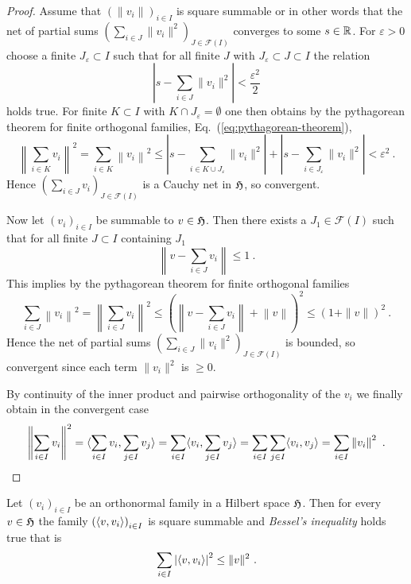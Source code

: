 \begin{proof}
  Assume that $\left(\|v_i\| \right)_{i\in I}$ is square summable or in other words that the net of partial sums
  $\left( \sum_{i\in J} \|v_i\|^2 \right)_{J\in\mathscr{F} (I)}$  converges to some $s \in \mathbb{R}$. 
  For $\varepsilon >0$ choose a finite $J_\varepsilon \subset I$ such that for all finite $J$ with 
  $J_\varepsilon \subset J\subset I$ the relation
  \[
           \left| s - \sum_{i\in J} \|v_i\|^2   \right| < \frac{\varepsilon^2}{2}
  \]
  holds true. For finite $K\subset I$ with $K\cap J_\varepsilon  =\emptyset$ one then obtains by the pythagorean theorem for 
  finite orthogonal families, Eq.~(\ref{eq:pythagorean-theorem}),
  \[
      \left\| \sum_{i\in K} v_i\right\|^2 =  \sum_{i\in K}  \left\| v_i\right\|^2 \leq 
       \left| s - \sum_{i\in K \cup J_\varepsilon} \|v_i\|^2   \right|  + \left| s - \sum_{i\in  J_\varepsilon} \|v_i\|^2   \right|
       < \varepsilon^2 \ .
  \]
  Hence  $\left( \sum_{i\in J} v_i \right)_{J\in\mathscr{F} (I)}$ is a Cauchy net in $\mathfrak{H}$, so convergent. 
 
  Now let  $(v_i)_{i\in I}$ be  summable to $v\in \mathfrak{H}$. 
  Then there exists a $J_1 \in \mathscr{F} (I)$ such that for all finite $J \subset I$ 
  containing  $J_1$
  \[
    \left\| v -  \sum_{i\in J} v_i \right\| \leq 1 \ .
  \] 
  This implies by the pythagorean theorem for finite orthogonal families 
   \[
    \sum_{i\in J} \left\| v_i \right\|^2 =  \left\|  \sum_{i\in J} v_i \right\|^2  \leq 
    \left(  \left\| v -  \sum_{i\in J} v_i \right\| +  \left\| v \right\| \right)^2 \leq  ( 1 + \| v\| )^2 \ .
  \] 
  Hence the net of partial sums $\left( \sum_{i\in J} \|v_i\|^2 \right)_{J\in\mathscr{F} (I)}$ is bounded, so convergent
  since each term $\|v_i\|^2$ is $\geq 0$.  

  By continuity of the inner product and pairwise orthogonality of the $v_i$ we finally obtain in the convergent case
  \[
   \left\| \sum_{i\in I} v_i \right\|^2 = \langle  \sum_{i\in I} v_i, \sum_{j\in I} v_j \rangle =
   \sum_{i\in I} \langle  v_i, \sum_{j\in I} v_j \rangle =  \sum_{i\in I} \sum_{j\in I} \langle  v_i, v_j \rangle =  \sum_{i\in I} \left\| v_i \right\|^2 \ .
  \]
\end{proof}

\begin{proposition}
  Let $(v_i)_{i\in I}$ be an orthonormal family in a Hilbert space $\mathfrak{H}$. Then for every $v \in \mathfrak{H}$ 
  the family $\left( \langle v,v_i \rangle \right)_{i\in I}$  is square summable and 
  \emph{Bessel's inequality} holds true that is 
  \[
    \sum_{i\in I} \left| \langle v,v_i \rangle \right|^2 \leq \| v \|^2 \ .
  \]
\end{proposition}

